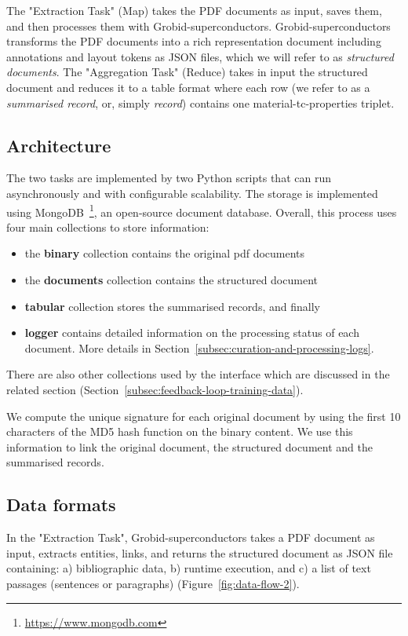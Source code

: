 \documentclass[a4paper]{article}
\begin{document}
The "Extraction Task" (Map) takes the PDF documents as input, saves them, and then processes them with Grobid-superconductors. 
Grobid-superconductors transforms the PDF documents into a rich representation document including annotations and layout tokens as JSON files, which we will refer to as \textit{structured documents}.  
The "Aggregation Task" (Reduce) takes in input the structured document and reduces it to a table format where each row (we refer to as a \textit{summarised record}, or, simply \textit{record}) contains one material-tc-properties triplet.

\subsection{Architecture}
\label{sec:architecture}

The two tasks are implemented by two Python scripts that can run asynchronously and with configurable scalability.
The storage is implemented using MongoDB~\footnote{\url{https://www.mongodb.com}}, an open-source document database. 
Overall, this process uses four main collections to store information: 
\begin{itemize}
    \item the \textbf{binary} collection contains the original pdf documents 
    \item the \textbf{documents} collection contains the structured document
    \item \textbf{tabular} collection stores the summarised records, and finally 
    \item \textbf{logger} contains detailed information on the processing status of each document. More details in Section~\ref{subsec:curation-and-processing-logs}.
\end{itemize}
There are also other collections used by the interface which are discussed in the related section (Section~\ref{subsec:feedback-loop-training-data}).

We compute the unique signature for each original document by using the first 10 characters of the MD5 hash function on the binary content. 
We use this information to link the original document, the structured document and the summarised records.


\subsection{Data formats}

In the "Extraction Task", Grobid-superconductors takes a PDF document as input, extracts entities, links, and returns the structured document as JSON file containing: a) bibliographic data, b) runtime execution, and c) a list of text passages (sentences or paragraphs) (Figure~\ref{fig:data-flow-2}). 
\end{document}
